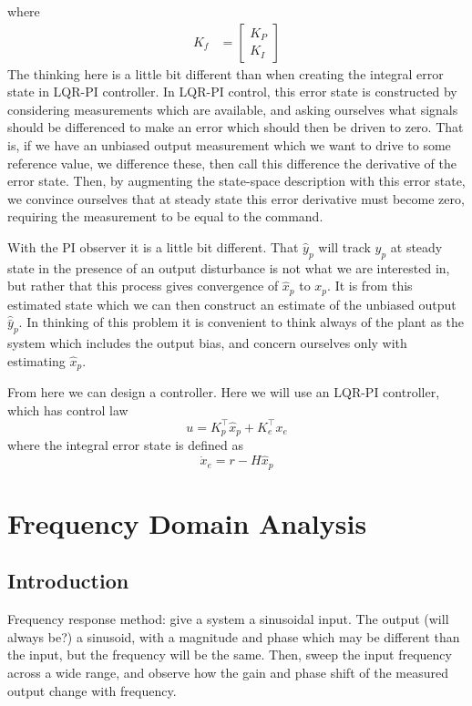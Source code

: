 where
\begin{align*}
  K_{f}&=
  \begin{bmatrix}
    K_{P} \\
    K_{I}
  \end{bmatrix}
\end{align*}
The thinking here is a little bit different than when creating the integral error state in LQR-PI controller.
In LQR-PI control, this error state is constructed by considering measurements which are available, and asking ourselves what signals should be differenced to make an error which should then be driven to zero.
That is, if we have an unbiased output measurement which we want to drive to some reference value, we difference these, then call this difference the derivative of the error state.
Then, by augmenting the state-space description with this error state, we convince ourselves that at steady state this error derivative must become zero, requiring the measurement to be equal to the command.

With the PI observer it is a little bit different.
That $\hat{y}_{p}$ will track $y_{p}$ at steady state in the presence of an output disturbance is not what we are interested in, but rather that this process gives convergence of $\hat{x}_{p}$ to $x_{p}$.
It is from this estimated state which we can then construct an estimate of the unbiased output $\hat{\bar{y}}_{p}$.
In thinking of this problem it is convenient to think always of the plant as the system which includes the output bias, and concern ourselves only with estimating $\hat{x}_{p}$.

From here we can design a controller.
Here we will use an LQR-PI controller, which has control law
\begin{equation*}
  u=K_{p}^{\top}\hat{x}_{p}+K_{e}^{\top}x_{e}
\end{equation*}
where the integral error state is defined as
\begin{equation*}
  \dot{x}_{e}=r-H\hat{x}_{p}
\end{equation*}

\chapter{Frequency Domain Analysis}

\section{Introduction}

Frequency response method: give a system a sinusoidal input.
The output (will always be?) a sinusoid, with a magnitude and phase which may be different than the input, but the frequency will be the same.
Then, sweep the input frequency across a wide range, and observe how the gain and phase shift of the measured output change with frequency.

